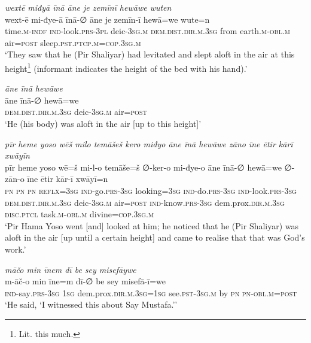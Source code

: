 \ea \label{ŽP.68}
\textit{wextē miđyā īnā āne je zemīnī hewāwe wuten} \\ 
\gll wext-ē mi-đye-ā īnā-∅ āne je zemīn-ī hewā=we wute=n \\ 
 time\textsc{.m}\textsc{-indf} \textsc{ind-}look\textsc{.prs}\textsc{-3pl} deic\textsc{-3sg}\textsc{.m} \textsc{dem.dist}\textsc{.dir}\textsc{.m}\textsc{.3sg} from earth\textsc{.m}\textsc{-obl}\textsc{.m} air\textsc{=\textsc{post}} sleep\textsc{.pst}\textsc{.ptcp}\textsc{.m}\textsc{=cop}\textsc{.3sg}\textsc{.m} \\ 
\glt `They saw that he (Pir Shaliyar) had levitated and slept aloft in the air at this height\footnote{Lit. this much.} (informant indicates the height of the bed with his hand).'
\z 
 
\ea \label{ŽP.70}
\textit{āne īnā hewāwe} \\ 
\gll āne īnā-∅ hewā=we \\ 
 \textsc{dem.dist}\textsc{.dir}\textsc{.m}\textsc{.3sg} deic\textsc{-3sg}\textsc{.m} air\textsc{=\textsc{post}} \\ 
\glt `He (his body) was aloft in the air [up to this height]'
\z 
 
\ea \label{ŽP.71}
\textit{pīr heme yoso wēš milo temāšeš kero miđyo āne īnā hewāwe zāno īne ētir kārī xwāyīn} \\ 
\gll pīr heme yoso wē=š mi-l-o temāše=š ∅-ker-o mi-đye-o āne īnā-∅ hewā=we ∅-zān-o īne ētir kār-ī xwāyī=n \\ 
 \textsc{pn} \textsc{pn} \textsc{pn} \textsc{reflx}\textsc{=3sg} \textsc{ind-}go\textsc{.prs}\textsc{-3sg} looking\textsc{=3sg} \textsc{ind-}do\textsc{.prs}\textsc{-3sg} \textsc{ind-}look\textsc{.prs}\textsc{-3sg} \textsc{dem.dist}\textsc{.dir}\textsc{.m}\textsc{.3sg} deic\textsc{-3sg}\textsc{.m} air\textsc{=\textsc{post}} \textsc{ind-}know\textsc{.prs}\textsc{-3sg} dem.prox\textsc{.dir}\textsc{.m}\textsc{.3sg} \textsc{disc.ptcl} task\textsc{.m}\textsc{-obl}\textsc{.m} divine\textsc{=cop}\textsc{.3sg}\textsc{.m} \\ 
\glt `Pir Hama Yoso went [and] looked at him; he noticed that he (Pir Shaliyar) was aloft in the air [up until a certain height] and came to realise that that was God’s work.'
\z 
 
\ea \label{ŽP.74}
\textit{māčo min īnem dī be sey misefāywe} \\ 
\gll m-āč-o min īne=m dī-∅ be sey misefā-ī=we \\ 
 \textsc{ind-}say\textsc{.prs}\textsc{-3sg} \textsc{1sg} dem.prox\textsc{.dir}\textsc{.m}\textsc{.3sg}\textsc{=\textsc{1sg}} see\textsc{.pst}\textsc{-3sg}\textsc{.m} by \textsc{pn} \textsc{pn}\textsc{-obl}\textsc{.m}\textsc{=\textsc{post}} \\ 
\glt `He said, ‘I witnessed this about Say Mustafa.’'
\z 
 
